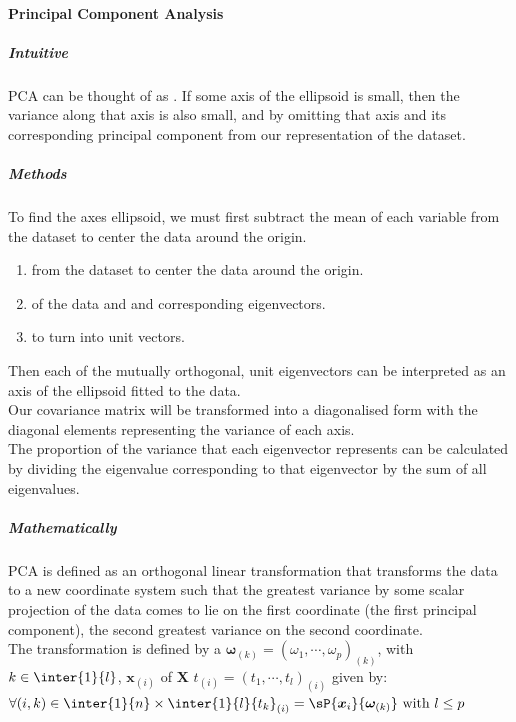 \paragraph{Principal Component Analysis}
\subparagraph{Intuitive}
PCA can be thought of as . If some axis of the ellipsoid is small, then the
variance along that axis is also small, and by omitting that axis and its corresponding principal
component from our representation of the dataset. 

\subparagraph{Methods}
To find the axes ellipsoid, we must first subtract the mean of each variable from the dataset
to center the data around the origin. 
\begin{enumerate}
	\item {} from the dataset to center the data around 
		the origin.
	\item {} of the data and  and
		corresponding eigenvectors.
	\item {} to turn into unit vectors.
\end{enumerate}
Then each of the mutually orthogonal, unit eigenvectors can be interpreted as an axis of the 
ellipsoid fitted to the data.\\ Our covariance matrix will be transformed into a diagonalised
form with the diagonal elements representing the variance of each axis.\\
The proportion of the variance that each eigenvector represents can be calculated by dividing 
the eigenvalue corresponding to that eigenvector by the sum of all eigenvalues.

\subparagraph{Mathematically}
PCA is defined as an orthogonal linear transformation that transforms the data to a new
coordinate system such that the greatest variance by some scalar projection of the 
data comes to lie on the first coordinate (the first principal component), the second greatest
variance on the second coordinate.\\

The transformation is defined by a 
$\bm{\omega}_{(k)}=(\omega_{1},\cdots,\omega_{p})_{(k)}$, with $k\in\inter{1}{l}$,  $\bm{x}_{(i)}$ of $\bm{X}$  $t_{(i)}=
(t_{1}, \cdots, t_{l})_{(i)}$ given by:
$\forall(i,k)\in\inter{1}{n}\times\inter{1}{l}{t_{k}}_{(i)}=\sP{\bm{x}_{i}}{\bm{\omega}_{(k)}}
\text{ with }l\leq p$\\

